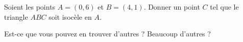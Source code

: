 
\begin{exercice}\label{exoSeconde-0005}

    Soient les points \( A=(0,6)\) et \( B=(4,1)\). Donner un point \( C\) tel que le triangle \( ABC\) soit isocèle en \( A\).

    Est-ce que vous pouvez en trouver d'autres ? Beaucoup d'autres ?

\end{exercice}
